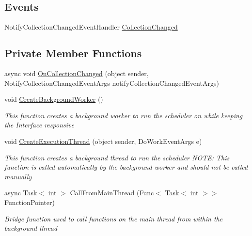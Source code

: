 \subsection*{Events}
\begin{DoxyCompactItemize}
\item 
Notify\+Collection\+Changed\+Event\+Handler \hyperlink{class_c_p_u___o_s___simulator_1_1_operating___system_1_1_scheduler_a13cc271f1cf9b76d1cbc87988c45e1fb}{Collection\+Changed}
\end{DoxyCompactItemize}
\subsection*{Private Member Functions}
\begin{DoxyCompactItemize}
\item 
async void \hyperlink{class_c_p_u___o_s___simulator_1_1_operating___system_1_1_scheduler_adad5f14e290b9b67f727cd24b4f09158}{On\+Collection\+Changed} (object sender, Notify\+Collection\+Changed\+Event\+Args notify\+Collection\+Changed\+Event\+Args)
\item 
void \hyperlink{class_c_p_u___o_s___simulator_1_1_operating___system_1_1_scheduler_a5de68bce87efcb0d511d7e5a9bd4fe1f}{Create\+Background\+Worker} ()
\begin{DoxyCompactList}\small\item\em This function creates a background worker to run the scheduler on while keeping the Interface responsive \end{DoxyCompactList}\item 
void \hyperlink{class_c_p_u___o_s___simulator_1_1_operating___system_1_1_scheduler_a6b7d6ca2dc12aa2290263cc94aab7779}{Create\+Execution\+Thread} (object sender, Do\+Work\+Event\+Args e)
\begin{DoxyCompactList}\small\item\em This function creates a background thread to run the scheduler N\+O\+T\+E\+: This function is called automatically by the background worker and should not be called manually \end{DoxyCompactList}\item 
async Task$<$ int $>$ \hyperlink{class_c_p_u___o_s___simulator_1_1_operating___system_1_1_scheduler_a6b162741d7ccadc56da0e5a1b545efda}{Call\+From\+Main\+Thread} (Func$<$ Task$<$ int $>$$>$ Function\+Pointer)
\begin{DoxyCompactList}\small\item\em Bridge function used to call functions on the main thread from within the background thread \end{DoxyCompactList}\item 
$$
\end{DoxyCompactItemize}
